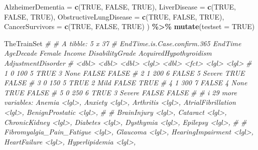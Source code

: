 \documentclass[
]{article}
\newenvironment{Shaded}{\begin{snugshade}}{\end{snugshade}}
\newcommand{\AttributeTok}[1]{\textcolor[rgb]{0.13,0.29,0.53}{#1}}
\newcommand{\CommentTok}[1]{\textcolor[rgb]{0.56,0.35,0.01}{\textit{#1}}}
\newcommand{\ConstantTok}[1]{\textcolor[rgb]{0.56,0.35,0.01}{#1}}
\newcommand{\FunctionTok}[1]{\textcolor[rgb]{0.13,0.29,0.53}{\textbf{#1}}}
\newcommand{\NormalTok}[1]{#1}
\newcommand{\SpecialCharTok}[1]{\textcolor[rgb]{0.81,0.36,0.00}{\textbf{#1}}}
\begin{document}
\begin{Shaded}
\begin{Highlighting}[]
  \AttributeTok{AlzheimerDementia =} \FunctionTok{c}\NormalTok{(}\ConstantTok{TRUE}\NormalTok{, }\ConstantTok{FALSE}\NormalTok{, }\ConstantTok{TRUE}\NormalTok{),}
  \AttributeTok{LiverDisease =} \FunctionTok{c}\NormalTok{(}\ConstantTok{TRUE}\NormalTok{, }\ConstantTok{FALSE}\NormalTok{, }\ConstantTok{TRUE}\NormalTok{),}
  \AttributeTok{ObstructiveLungDisease =} \FunctionTok{c}\NormalTok{(}\ConstantTok{TRUE}\NormalTok{, }\ConstantTok{FALSE}\NormalTok{, }\ConstantTok{TRUE}\NormalTok{),}
  \AttributeTok{CancerSurvivors =} \FunctionTok{c}\NormalTok{(}\ConstantTok{TRUE}\NormalTok{, }\ConstantTok{FALSE}\NormalTok{, }\ConstantTok{TRUE}\NormalTok{)}
\NormalTok{) }\SpecialCharTok{\%\textgreater{}\%}
  \FunctionTok{mutate}\NormalTok{(}\AttributeTok{testset =} \ConstantTok{TRUE}\NormalTok{)}

\NormalTok{TheTrainSet}
\CommentTok{\# \# A tibble: 5 x 37}
\CommentTok{\#   EndTime.is.Case.confirm.365 EndTime AgeDecade Female Income DisabilityGrade AcquiredHypothyroidism AdjustmentDisorder}
\CommentTok{\#                         \textless{}dbl\textgreater{}   \textless{}dbl\textgreater{}     \textless{}dbl\textgreater{} \textless{}lgl\textgreater{}   \textless{}dbl\textgreater{} \textless{}fct\textgreater{}           \textless{}lgl\textgreater{}                  \textless{}lgl\textgreater{}             }
\CommentTok{\# 1                           0     100         5 TRUE        3 None            FALSE                  FALSE             }
\CommentTok{\# 2                           1     200         6 FALSE       5 Severe          TRUE                   FALSE             }
\CommentTok{\# 3                           0     150         5 TRUE        2 Mild            FALSE                  TRUE              }
\CommentTok{\# 4                           1     300         7 FALSE       4 None            TRUE                   FALSE             }
\CommentTok{\# 5                           0     250         6 TRUE        3 Severe          FALSE                  FALSE             }
\CommentTok{\# \# i 29 more variables: Anemia \textless{}lgl\textgreater{}, Anxiety \textless{}lgl\textgreater{}, Arthritis \textless{}lgl\textgreater{}, AtrialFibrillation \textless{}lgl\textgreater{}, BenignProstatic \textless{}lgl\textgreater{},}
\CommentTok{\# \#   BrainInjury \textless{}lgl\textgreater{}, Cataract \textless{}lgl\textgreater{}, ChronicKidney \textless{}lgl\textgreater{}, Diabetes \textless{}lgl\textgreater{}, Dysthymia \textless{}lgl\textgreater{}, Epilepsy \textless{}lgl\textgreater{},}
\CommentTok{\# \#   Fibromyalgia\_Pain\_Fatigue \textless{}lgl\textgreater{}, Glaucoma \textless{}lgl\textgreater{}, HearingImpairment \textless{}lgl\textgreater{}, HeartFailure \textless{}lgl\textgreater{}, Hyperlipidemia \textless{}lgl\textgreater{},}

\end{Highlighting}
\end{Shaded}
\end{document}
